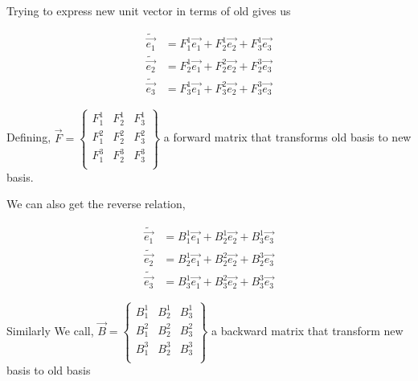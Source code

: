 \documentclass{article}
\begin{document}
	Trying to express new unit vector in terms of old gives us
	\begin{tcolorbox}
		\begin{equation}
			\begin{split}
				\widetilde{\overrightarrow{e_{1}}} &= F_{1}^{1}\overrightarrow{e_{1}} + F_{2}^{1}\overrightarrow{e_{2}} + F_{3}^{1}\overrightarrow{e_{3}}\\
				\widetilde{\overrightarrow{e_{2}}} &= F_{2}^{1}\overrightarrow{e_{1}} + F_{2}^{2}\overrightarrow{e_{2}} + F_{2}^{3}\overrightarrow{e_{3}}\\
				\widetilde{\overrightarrow{e_{3}}} &= F_{3}^{1}\overrightarrow{e_{1}} + F_{3}^{2}\overrightarrow{e_{2}} + F_{3}^{3}\overrightarrow{e_{3}}
			\end{split} \label{eq1} %
		\end{equation}
	\end{tcolorbox}
	

	Defining, $\overrightarrow{F} = \begin{Bmatrix}
		F_{1}^{1}	& F_{2}^{1} & F_{3}^{1}\\
		F_{1}^{2}	& F_{2}^{2} & F_{3}^{2}\\
		F_{1}^{3}	& F_{2}^{3} & F_{3}^{3}\\
	\end{Bmatrix}$ a forward matrix that transforms old basis to new basis.
	
	We can also get the reverse relation,
	
	\begin{tcolorbox}
		\begin{equation}
			\begin{split}
				\widetilde{\overrightarrow{e_{1}}} &= B_{1}^{1}\overrightarrow{e_{1}} + B_{2}^{1}\overrightarrow{e_{2}} + B_{3}^{1}\overrightarrow{e_{3}}\\
				\widetilde{\overrightarrow{e_{2}}} &= B_{2}^{1}\overrightarrow{e_{1}} + B_{2}^{2}\overrightarrow{e_{2}} + B_{2}^{3}\overrightarrow{e_{3}}\\
				\widetilde{\overrightarrow{e_{3}}} &= B_{3}^{1}\overrightarrow{e_{1}} + B_{3}^{2}\overrightarrow{e_{2}} + B_{3}^{3}\overrightarrow{e_{3}}
			\end{split} \label{eq2}
		\end{equation}
	\end{tcolorbox}
	
	
	Similarly We call, $\overrightarrow{B} = \begin{Bmatrix}
		B_{1}^{1}	& B_{2}^{1} & B_{3}^{1}\\
		B_{1}^{2}	& B_{2}^{2} & B_{3}^{2}\\
		B_{1}^{3}	& B_{2}^{3} & B_{3}^{3}\\
	\end{Bmatrix}$ a backward matrix that transform new basis to old basis
\end{document}
